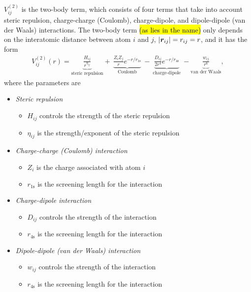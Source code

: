 $V_{ij}^{(2)}$ is the two-body term, which consists of four terms that take into account steric repulsion, charge-charge (Coulomb), charge-dipole, and dipole-dipole (van der Waals) interactions. The two-body term \hl{(as lies in the name)} only depends on the interatomic distance between atom $i$ and $j$, $|\boldsymbol{r}_{ij}| = r_{ij} = r$, and it has the form%
\begin{align*}
    V_{ij}^{(2)} (r) = 
    \underbrace{
        \frac{H_{ij}}{r^{\eta_{ij}}}
    }_{\text{steric repulsion}}
    +~ 
    \underbrace{
        \frac{Z_iZ_j}{r}e^{-r/r_{1\text{s}}}
    }_{\text{Coulomb}}
    ~-~
    \underbrace{
        \frac{D_{ij}}{2r^4}e^{-r/r_{4\text{s}}}
    }_{\text{charge-dipole}}
    ~- 
    \underbrace{
        \frac{w_{ij}}{r^6}
    }_{\text{van der Waals}}
    ,
\end{align*}%
where the parameters are%
\begin{itemize}[%
    leftmargin=*,%
    label={}%
]
    \item \textit{Steric repulsion}
    \begin{itemize}[label=$\bullet$]
        \item $H_{ij}$ controls the strength of the steric repulsion
        \item $\eta_{ij}$ is the strength/exponent of the steric repulsion
    \end{itemize}
    \item \textit{Charge-charge (Coulomb) interaction}
    \begin{itemize}[label=$\bullet$]
        \item $Z_i$ is the charge associated with atom $i$
        \item $r_{1\text{s}}$ is the screening length for the interaction
    \end{itemize}
    \item \textit{Charge-dipole interaction}
    \begin{itemize}[label=$\bullet$]
        \item $D_{ij}$ controls the strength of the interaction
        \item $r_{4\text{s}}$ is the screening length for the interaction
    \end{itemize}
    \item \textit{Dipole-dipole (van der Waals) interaction}
    \begin{itemize}[label=$\bullet$]
        \item $w_{ij}$ controls the strength of the interaction
        \item $r_{4\text{s}}$ is the screening length for the interaction
    \end{itemize}
    \vspace{10pt}
\end{itemize}

